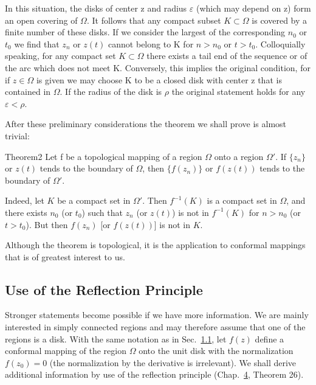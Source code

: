 In this situation, the disks of center z and radius $\varepsilon$ (which may depend on z) form an open covering of $\Omega$. It follows that any compact subset $K \subset \Omega$ is covered by a finite number of these disks. If we consider the largest of the corresponding $n_{0}$ or $t_{0}$ we find that $z_{n}$ or $z(t)$ cannot belong to K for $n > n_{0}$ or $t > t_{0}$. Colloquially speaking, for any compact set $K \subset \Omega$ there exists a tail end of the sequence or of the arc which does not meet K. Conversely, this implies the original condition, for if $z \in \Omega$ is given we may choose K to be a closed disk with center z that is contained in $\Omega$. If the radius of the disk is $\rho$ the original statement holds for any $\varepsilon < \rho$.

After these preliminary considerations the theorem we shall prove is almost trivial:

\begingroup\renewcommand{\thefootnote}{}\endgroup

\begin{originalstatement}{Theorem}{2}\label{thm:6.2}
Let f be a topological mapping of a region $\Omega$ onto a region $\Omega'$. If $\{z_{n}\}$ or $z(t)$ tends to the boundary of $\Omega$, then $\{f(z_{n})\}$ or $f(z(t))$ tends to the boundary of $\Omega'$.
\end{originalstatement}
Indeed, let $K$ be a compact set in $\Omega'$. Then $f^{-1}(K)$ is a compact set in $\Omega$, and there exists $n_0$ (or $t_0$) such that $z_n$ (or $z(t)$) is not in $f^{-1}(K)$ for $n > n_0$ (or $t > t_0$). But then $f(z_n)$ [or $f(z(t))$] is not in $K$.

Although the theorem is topological, it is the application to conformal mappings that is of greatest interest to us.

\setcounter{section}{1}\setcounter{subsection}{2}\subsection{Use of the Reflection Principle}\label{sec:6.1.3}
Stronger statements become possible if we have more information. We are mainly interested in simply connected regions and may therefore assume that one of the regions is a disk. With the same notation as in Sec.~\hyperref[sec:6.1.1]{1.1}, let $f(z)$ define a conformal mapping of the region $\Omega$ onto the unit disk with the normalization $f(z_{0}) = 0$ (the normalization by the derivative is irrelevant). We shall derive additional information by use of the reflection principle (Chap.~\hyperref[chap:4]{4}, Theorem 26).

